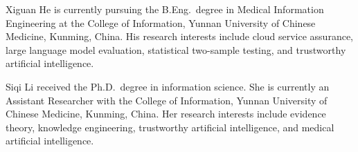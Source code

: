 \vfill
\begin{IEEEbiographynophoto}{Xiguan He}
is currently pursuing the B.Eng.\ degree in Medical Information Engineering at the College of Information, Yunnan University of Chinese Medicine, Kunming, China. His research interests include cloud service assurance, large language model evaluation, statistical two-sample testing, and trustworthy artificial intelligence.
\end{IEEEbiographynophoto}

\begin{IEEEbiographynophoto}{Siqi Li}
received the Ph.D.\ degree in information science. She is currently an Assistant Researcher with the College of Information, Yunnan University of Chinese Medicine, Kunming, China. Her research interests include evidence theory, knowledge engineering, trustworthy artificial intelligence, and medical artificial intelligence.
\end{IEEEbiographynophoto}
